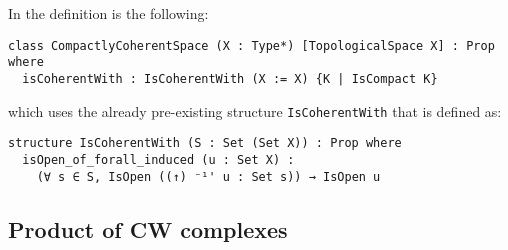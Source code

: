 In \mathlib the definition is the following: 

\begin{lstlisting}[frame=single]
class CompactlyCoherentSpace (X : Type*) [TopologicalSpace X] : Prop where
  isCoherentWith : IsCoherentWith (X := X) {K | IsCompact K}
\end{lstlisting}

which uses the already pre-existing structure \lstinline|IsCoherentWith| that is defined as: 

\begin{lstlisting}[frame=single]
structure IsCoherentWith (S : Set (Set X)) : Prop where
  isOpen_of_forall_induced (u : Set X) : 
    (∀ s ∈ S, IsOpen ((↑) ⁻¹' u : Set s)) → IsOpen u
\end{lstlisting}


\subsection{Product of CW complexes}

